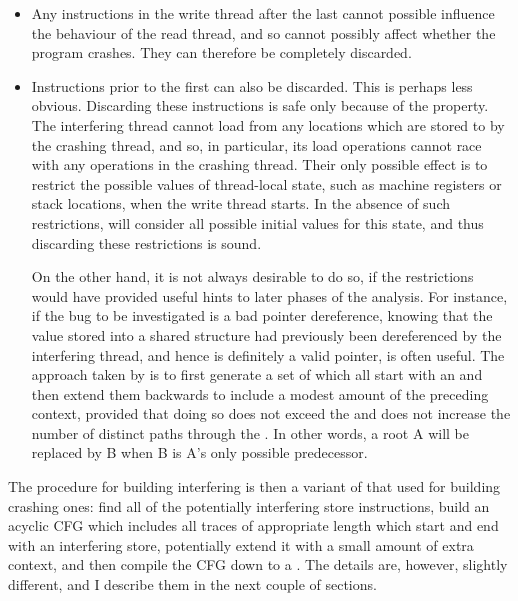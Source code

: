 \begin{itemize}
\item Any instructions in the write thread after the last
   cannot possible influence the behaviour
  of the read thread, and so cannot possibly affect whether the
  program crashes.  They can therefore be completely discarded.
\item Instructions prior to the first  can
  also be discarded.  This is perhaps less obvious.  Discarding these
  instructions is safe only because of the 
  property.  The interfering thread cannot load from any locations
  which are stored to by the crashing thread, and so, in particular,
  its load operations cannot race with any operations in the crashing
  thread.  Their only possible effect is to restrict the possible
  values of thread-local state, such as machine registers or stack
  locations, when the write thread starts.  In the absence of such
  restrictions, {\technique} will consider all possible initial values
  for this state, and thus discarding these restrictions is sound.

  On the other hand, it is not always desirable to do so, if the
  restrictions would have provided useful hints to later phases of the
  analysis.  For instance, if the bug to be investigated is a bad
  pointer dereference, knowing that the value stored into a shared
  structure had previously been dereferenced by the interfering
  thread, and hence is definitely a valid pointer, is often useful.
  The approach taken by {\implementation} is to first generate a set
  of  which all start with an  and then extend them backwards to include a modest amount
  of the preceding context, provided that doing so does not exceed the
   and does not increase the number of
  distinct paths through the .  In other words, a
   root A will be replaced by B when B is A's only
  possible predecessor.
\end{itemize}

The procedure for building interfering {\StateMachines} is then a
variant of that used for building crashing ones: find all of the
potentially interfering store instructions, build an acyclic CFG which
includes all traces of appropriate length which start and end with an
interfering store, potentially extend it with a small amount of extra
context, and then compile the CFG down to a {\StateMachine}.  The
details are, however, slightly different, and I describe them in the
next couple of sections.

